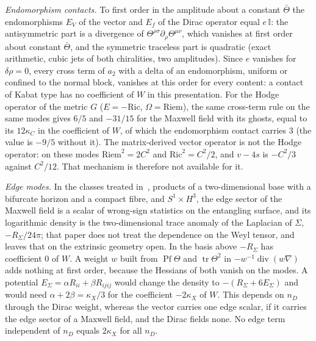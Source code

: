 \emph{Endomorphism contacts.} To first order in the amplitude about a constant \(\bar\Theta\) the endomorphisms \(E_V\) of the vector and \(E_f\) of the Dirac operator equal \(e\,\mathbb I\): the antisymmetric part is a divergence of \(\Theta^{\rho\sigma}\partial_\rho\Theta^{\mu\nu}\), which vanishes at first order about constant \(\bar\Theta\), and the symmetric traceless part is quadratic (exact arithmetic, cubic jets of both chiralities, two amplitudes). Since \(e\) vanishes for \(\delta\rho=0\), every cross term of \(a_2\) with a delta of an endomorphism, uniform or confined to the normal block, vanishes at this order for every content: a contact of Kabat type has no coefficient of \(W\) in this presentation. For the Hodge operator of the metric \(G\) (\(E=-\mathrm{Ric}\), \(\Omega=\mathrm{Riem}\)), the same cross-term rule on the same modes gives \(6/5\) and \(-31/15\) for the Maxwell field with its ghosts, equal to its \(12\kappa_C\) in the coefficient of \(W\), of which the endomorphism contact carries \(3\) (the value is \(-9/5\) without it). The matrix-derived vector operator is not the Hodge operator: on these modes \(\mathrm{Riem}^2=2C^2\) and \(\mathrm{Ric}^2=C^2/2\), and \(v-4s\) is \(-C^2/3\) against \(C^2/12\). That mechanism is therefore not available for it.

\emph{Edge modes.} In the classes treated in~\cite{DonnellyWall2016}, products of a two-dimensional base with a bifurcate horizon and a compact fibre, and \(S^1\times H^3\), the edge sector of the Maxwell field is a scalar of wrong-sign statistics on the entangling surface, and its logarithmic density is the two-dimensional trace anomaly of the Laplacian of \(\Sigma\), \(-R_\Sigma/24\pi\); that paper does not treat the dependence on the Weyl tensor, and leaves that on the extrinsic geometry open. In the basis above \(-R_\Sigma\) has coefficient \(0\) of \(W\). A weight \(w\) built from \(\operatorname{Pf}\Theta\) and \(\operatorname{tr}\Theta^2\) in \(-w^{-1}\operatorname{div}(w\nabla)\) adds nothing at first order, because the Hessians of both vanish on the modes. A potential \(E_\Sigma=\alpha R_{ii}+\beta R_{ijij}\) would change the density to \(-(R_\Sigma+6E_\Sigma)\) and would need \(\alpha+2\beta=\kappa_X/3\) for the coefficient \(-2\kappa_X\) of \(W\). This depends on \(n_D\) through the Dirac weight, whereas the vector carries one edge scalar, if it carries the edge sector of a Maxwell field, and the Dirac fields none. No edge term independent of \(n_D\) equals \(2\kappa_X\) for all \(n_D\).

